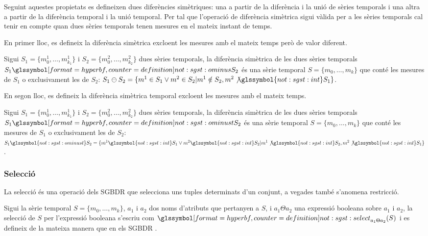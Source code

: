 Seguint aquestes propietats es defineixen dues diferències
simètriques: una a partir de la diferència i la unió de sèries
temporals i una altra a partir de la diferència temporal i la unió
temporal.  Per tal que l'operació de diferència simètrica sigui vàlida
per a les sèries temporals cal tenir en compte quan dues sèries
temporals tenen mesures en el mateix instant de temps.

En primer lloc, es defineix la diferència simètrica excloent les
mesures amb el mateix temps però de valor diferent.
\begin{definition}
  Sigui $S_1=\{m_0^1, \dotsc, m_{k_1}^1\}$ i $S_2=\{m_0^2, \dotsc,
  m_{k_2}^2\}$ dues sèries temporals, la diferència simètrica de les
  dues sèries temporals $S_1 \glssymboldef{not:sgst:ominus} S_2$ és
  una sèrie temporal $S=\{m_0, \dotsc, m_k\}$ que conté les mesures de
  $S_1$ o exclusivament les de $S_2$: $S_1 \ominus S_2 = \{ m^1 \in
  S_1 \vee m^2 \in S_2 | m^1 \notin S_2, m^2
  \not\glssymbol{not:sgst:int} S_1 \}$.
\end{definition}

En segon lloc, es defineix la diferència simètrica temporal excloent les
mesures amb el mateix temps.
\begin{definition}
  Sigui $S_1=\{m_0^1, \dotsc, m_{k_1}^1\}$ i $S_2=\{m_0^2, \dotsc,
  m_{k_2}^2\}$ dues sèries temporals, la diferència simètrica de les
  dues sèries temporals $S_1 \glssymboldef{not:sgst:ominust} S_2$ és
  una sèrie temporal $S=\{m_0, \dotsc, m_k\}$ que conté les mesures de
  $S_1$ o exclusivament les de $S_2$: $S_1
  \glssymbol{not:sgst:ominust} S_2 = \{ m^1 \glssymbol{not:sgst:int}
  S_1 \vee m^2 \glssymbol{not:sgst:int} S_2 | m^1
  \not\glssymbol{not:sgst:int} S_2, m^2 \not\glssymbol{not:sgst:int}
  S_1 \}$.
\end{definition}



\subsubsection{Selecció}

La selecció és una operació dels \gls{SGBDR} que selecciona uns tuples
determinats d'un conjunt, a vegades també s'anomena restricció.

\begin{definition}[selecció]
  Sigui la sèrie temporal $S=\{ m_0,\dotsc,m_k\}$, $a_1$ i $a_2$ dos
  noms d'atributs que pertanyen a $S$, i $a_1 \Theta a_2$ una
  expressió booleana sobre $a_1$ i $a_2$, la selecció de $S$ per
  l'expressió booleana s'escriu com
  $\glssymboldef{not:sgst:select}_{a_1 \Theta a_2}(S)$  i es defineix
  de la mateixa manera que en els
  \gls{SGBDR} \parencite[cap.~7]{date04:introduction8}.
\end{definition}

